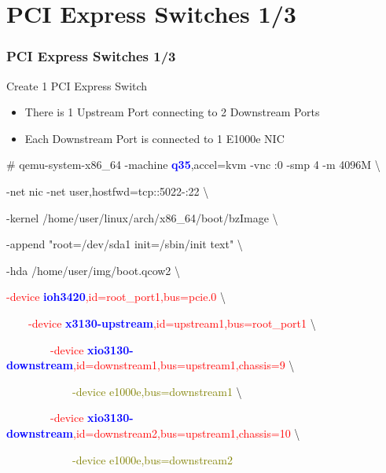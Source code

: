 \documentclass[aspectratio=169]{beamer}
\begin{document}
\section{PCI Express Switches 1/3}
\begin{frame}
\frametitle{PCI Express Switches 1/3}
{\LARGE Create 1 PCI Express Switch}
\begin{itemize}
\item There is 1 Upstream Port connecting to 2 Downstream Ports
\item Each Downstream Port is connected to 1 E1000e NIC
\end{itemize}
\begin{block}{}

\# qemu-system-x86\_64 -machine \textbf{\textcolor{blue}{q35}},accel=kvm -vnc :0 -smp 4 -m 4096M \textbackslash

-net nic -net user,hostfwd=tcp::5022-:22 \textbackslash

-kernel /home/user/linux/arch/x86\_64/boot/bzImage \textbackslash
	
-append "root=/dev/sda1 init=/sbin/init text" \textbackslash

-hda /home/user/img/boot.qcow2 \textbackslash

\textcolor{red}{-device \textbf{\textcolor{blue}{ioh3420}},id=root\_port1,bus=pcie.0} \textbackslash

\textcolor{red}{\ \ \ \ -device \textbf{\textcolor{blue}{x3130-upstream}},id=upstream1,bus=root\_port1} \textbackslash

\textcolor{red}{\ \ \ \ \ \ \ \ -device \textbf{\textcolor{blue}{xio3130-downstream}},id=downstream1,bus=upstream1,chassis=9} \textbackslash

\textcolor{olive}{\ \ \ \ \ \ \ \ \ \ \ \ -device e1000e,bus=downstream1} \textbackslash

\textcolor{red}{\ \ \ \ \ \ \ \ -device \textbf{\textcolor{blue}{xio3130-downstream}},id=downstream2,bus=upstream1,chassis=10} \textbackslash

\textcolor{olive}{\ \ \ \ \ \ \ \ \ \ \ \ -device e1000e,bus=downstream2}

\end{block}
\end{frame}

\end{document}
